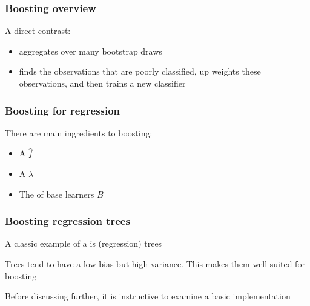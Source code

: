 \documentclass[12pt]{beamer}
\begin{document}
\begin{frame}[fragile]
\frametitle{Boosting overview}
A direct contrast:
\vsp

\begin{itemize}
\item  {} aggregates over many  bootstrap draws
\item  {} finds the observations that are poorly classified, up weights these observations, and then trains 
a new classifier
\end{itemize}
\end{frame}


\begin{frame}[fragile]
\frametitle{Boosting for regression}
There are  main ingredients to boosting:
\vsp

\begin{itemize}
\item A  $\hat{f}$

\item A  $\lambda$
\item The  of base learners $B$

\end{itemize}
\end{frame}
\begin{frame}[fragile]
\frametitle{Boosting regression trees}
A classic example of a  is (regression) trees

\vsp
{} Trees tend to have a low bias but high variance. This makes them well-suited 
for boosting

\vsp
Before discussing  further, it is instructive to examine a basic implementation

\end{frame}
\end{document}
